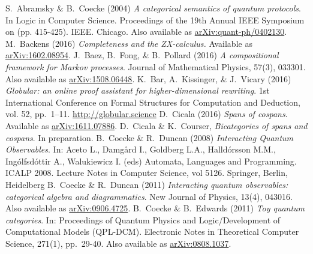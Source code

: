 \documentclass[11pt]{amsart}
\theoremstyle{remark}
\theoremstyle{definition}
\begin{document}
%
%

\begin{thebibliography}{100}	
	S.~Abramsky \& B.~Coecke
	(2004)
	\emph{A categorical semantics of quantum protocols}. 
	In Logic in Computer Science. 
	Proceedings of the 19th Annual IEEE Symposium on (pp. 415-425). 
	IEEE.
	Chicago.
	Also available as \href{https://arxiv.org/abs/quant-ph/0402130}{	arXiv:quant-ph/0402130}.
	M.~Backens
	(2016)
	\emph{Completeness and the ZX-calculus.} 
	Available as \href{https://arxiv.org/abs/1602.08954}{arXiv:1602.08954}.
	J.~Baez, B.~Fong, \& B.~Pollard
	(2016)
	\emph{A compositional framework for Markov processes}. 
	Journal of Mathematical Physics, 
	57(3), 033301.
	Also available as \href{https://arxiv.org/abs/1508.06448}{arXiv:1508.06448}.
	K.~Bar, A.~Kissinger, \& J.~Vicary
	(2016)
	\emph{Globular: an online proof assistant for higher-dimensional rewriting}. 
	1st International Conference on Formal Structures for Computation and Deduction,
	vol. 52, pp.~1–11.
	\href{http://globular.science}{http://globular.science}
	D.~Cicala
	(2016)
	\emph{Spans of cospans}.
	Available as \href{https://arxiv.org/abs/1611.07886}{arXiv:1611.07886}.
	D.~Cicala \& K.~Courser,
	\emph{Bicategories of spans and cospans}.
	In preparation.
	B.~Coecke \& R.~Duncan 
	(2008) 
	\emph{Interacting Quantum Observables}. 
	In: Aceto L., Damgård I., Goldberg L.A., Halldórsson M.M., Ingólfsdóttir A., Walukiewicz I. (eds) 
	Automata, Languages and Programming. 
	ICALP 2008. 
	Lecture Notes in Computer Science, vol 5126. 
	Springer, Berlin, Heidelberg
	B.~Coecke \& R.~Duncan
	(2011)
	\emph{Interacting quantum observables: categorical algebra and diagrammatics}. 
	New Journal of Physics, 13(4), 043016.
	Also available as \href{https://arxiv.org/abs/0906.4725}{arXiv:0906.4725}.
	B.~Coecke \& B.~Edwards
	(2011)
	\emph{Toy quantum categories}.
	In: Proceedings of Quantum Physics and Logic/Development of Computational Models (QPL-DCM).
	Electronic Notes in Theoretical Computer Science,
	271(1), pp.~29-40.
	Also available as \href{https://arxiv.org/abs/0808.1037}{arXiv:0808.1037}.

\end{thebibliography}
\end{document}
